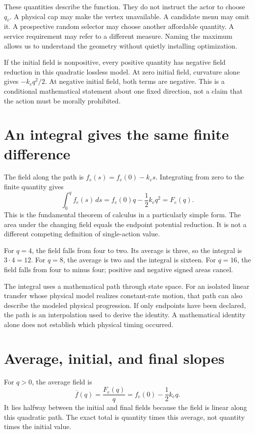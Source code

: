 These quantities describe the function. They do not instruct the actor to choose \(q_v\). A physical cap may make the vertex unavailable. A candidate menu may omit it. A prospective random selector may choose another affordable quantity. A service requirement may refer to a different measure. Naming the maximum allows us to understand the geometry without quietly installing optimization.

If the initial field is nonpositive, every positive quantity has negative field reduction in this quadratic lossless model. At zero initial field, curvature alone gives \(-k_e q^2/2\). At negative initial field, both terms are negative. This is a conditional mathematical statement about one fixed direction, not a claim that the action must be morally prohibited.

\section{An integral gives the same finite difference}
The field along the path is \(f_e(s)=f_e(0)-k_e s\). Integrating from zero to the finite quantity gives
\begin{equation}
 \int_0^q f_e(s)\,ds=f_e(0)q-\frac12 k_e q^2=F_e(q).
\end{equation}
This is the fundamental theorem of calculus in a particularly simple form. The area under the changing field equals the endpoint potential reduction. It is not a different competing definition of single-action value.

For \(q=4\), the field falls from four to two. Its average is three, so the integral is \(3\cdot4=12\). For \(q=8\), the average is two and the integral is sixteen. For \(q=16\), the field falls from four to minus four; positive and negative signed areas cancel.

The integral uses a mathematical path through state space. For an isolated linear transfer whose physical model realizes constant-rate motion, that path can also describe the modeled physical progression. If only endpoints have been declared, the path is an interpolation used to derive the identity. A mathematical identity alone does not establish which physical timing occurred.

\section{Average, initial, and final slopes}
For \(q>0\), the average field is
\begin{equation}
 \overline f(q)=\frac{F_e(q)}{q}=f_e(0)-\frac12 k_e q.
\end{equation}
It lies halfway between the initial and final fields because the field is linear along this quadratic path. The exact total is quantity times this average, not quantity times the initial value.


